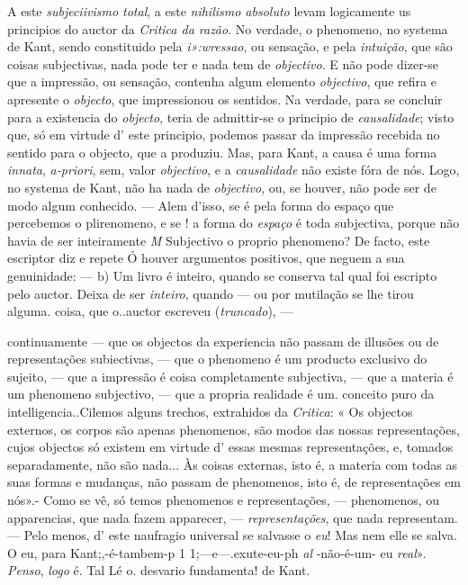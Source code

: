 A este \emph{subjeciivismo total}, a este \emph{nihilismo absoluto} levam logicamente us principios do auctor da \emph{Critica da razão}. No verdade, o phenomeno, no systema de Kant, sendo constituido pela \emph{i»:wressao}, ou sensação, e pela \emph{intuição}, que são coisas subjectivas, nada pode ter e nada tem de \emph{objectivo}. E não pode dizer-se que a impressão, ou sensação, contenha algum elemento \emph{objectivo}, que refira e apresente o \emph{objecto}, que impressionou os sentidos. Na verdade, para se concluir para a existencia do \emph{objecto}, teria de admittir-se o principio de \emph{causalidade}; visto que, só em virtude d' este principio, podemos passar da impressão recebida no sentido para o objecto, que a produziu. Mas, para Kant, a causa é uma forma \emph{innata}, \emph{a-priori}, sem, valor \emph{objectivo}, e a \emph{causalidade} não existe fóra de nós. Logo, no systema de Kant, não ha nada de \emph{objectivo}, ou, se houver, não pode ser de modo algum conhecido. --- Alem d'isso, se é pela forma do espaço que percebemos o plirenomeno, e se ! a forma do \emph{espaço} é toda subjectiva, porque não havia de ser inteiramente \emph{M} Subjectivo o proprio phenomeno? De facto, este escriptor diz e repete Ó   houver argumentos positivos, que neguem a sua genuinidade: --- b) Um livro é inteiro, quando se conserva tal qual foi escripto pelo auctor. Deixa de ser \emph{inteiro}, quando --- ou por mutilação se lhe tirou alguma. coisa, que o..auctor escreveu (\emph{truncado}), ---

continuamente --- que os objectos da experiencia não passam de illusões ou de representações subiectivas, --- que o phenomeno é um producto exclusivo do sujeito, --- que a impressão é coisa completamente subjectiva, --- que a materia é um phenomeno subjectivo, --- que a propria realidade é um. conceito puro da intelligencia..Cilemos alguns trechos, extrahidos da \emph{Critica}: « Os objectos externos, os corpos são apenas phenomenos, são modos das nossas representações, cujos objectos só existem em virtude d' essas mesmas representações, e, tomados separadamente, não são nada... Às coisas externas, isto é, a materia com todas as suas formas e mudanças, não passam de phenomenos, isto é, de representações em nós».- Como se vê, só temos phenomenos e representações, --- phenomenos, ou apparencias, que nada fazem apparecer, --- \emph{representações}, que nada representam. --- Pelo menos, d' este naufragio universal se salvasse o \emph{eu}! Mas nem elle se salva. O eu, para Kant;,-é-tambem-p 1 1;---e---.exute-eu-ph \emph{al} -não-é-um- eu \emph{real}». \emph{Penso}, \emph{logo} é. Tal Lé o. desvario fundamenta! de Kant.

